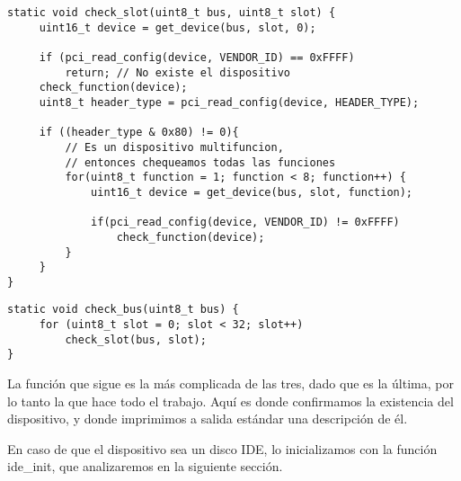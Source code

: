 \begin{lstlisting}[style=customcmucho]
static void check_slot(uint8_t bus, uint8_t slot) {
     uint16_t device = get_device(bus, slot, 0);
 
     if (pci_read_config(device, VENDOR_ID) == 0xFFFF)
         return; // No existe el dispositivo
     check_function(device);
     uint8_t header_type = pci_read_config(device, HEADER_TYPE);

     if ((header_type & 0x80) != 0){
         // Es un dispositivo multifuncion, 
         // entonces chequeamos todas las funciones
         for(uint8_t function = 1; function < 8; function++) {
             uint16_t device = get_device(bus, slot, function);
             
             if(pci_read_config(device, VENDOR_ID) != 0xFFFF)
                 check_function(device);
         }
     } 
}
\end{lstlisting}

\begin{lstlisting}[style=customcmucho]
static void check_bus(uint8_t bus) { 
     for (uint8_t slot = 0; slot < 32; slot++)
         check_slot(bus, slot);
}
\end{lstlisting}

La función que sigue es la más complicada de las tres, dado que es la última, por lo tanto la que hace todo el trabajo. Aquí es donde confirmamos la existencia del dispositivo, y donde imprimimos a salida estándar una descripción de él.

En caso de que el dispositivo sea un disco IDE, lo inicializamos con la función ide\_init, que analizaremos en la siguiente sección.

